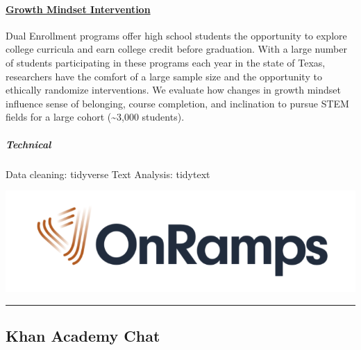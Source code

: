 \documentclass[
]{article}
\begin{document}
\begin{row}

\begin{col-sm-6}

\hypertarget{growth-mindset-intervention-1}{%
\paragraph{\texorpdfstring{\href{https://katjanewilson.github.io/WhartonAnalytics-MLB/}{Growth
Mindset
Intervention}}{Growth Mindset Intervention}}\label{growth-mindset-intervention-1}}

Dual Enrollment programs offer high school students the opportunity to
explore college curricula and earn college credit before graduation.
With a large number of students participating in these programs each
year in the state of Texas, researchers have the comfort of a large
sample size and the opportunity to ethically randomize interventions. We
evaluate how changes in growth mindset influence sense of belonging,
course completion, and inclination to pursue STEM fields for a large
cohort (\textasciitilde3,000 students).

\hypertarget{technical}{%
\subparagraph{Technical}\label{technical}}

Data cleaning: tidyverse Text Analysis: tidytext

\end{col-sm-6}

\begin{col-sm-6}

\includegraphics[width=800px]{images/onramps}

\end{col-sm-6}

\end{row}

\begin{center}\rule{0.5\linewidth}{0.5pt}\end{center}

\hypertarget{khan-academy-chat}{%
\subsection{Khan Academy Chat}\label{khan-academy-chat}}
\end{document}
